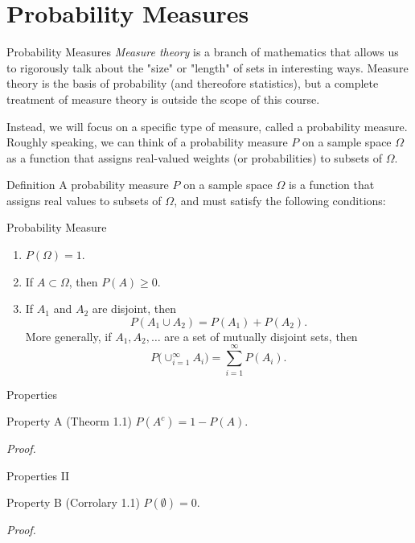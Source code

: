 \section{Probability Measures}

\begin{frame}{Probability Measures}
\emph{Measure theory} is a branch of mathematics that allows us to rigorously talk about the "size" or "length" of sets in interesting ways.
Measure theory is the basis of probability (and thereofore statistics), but a complete treatment of measure theory is outside the scope of this course. 

Instead, we will focus on a specific type of measure, called a \alert{probability measure}.
Roughly speaking, we can think of a probability measure $P$ on a sample space $\Omega$ as a function that assigns real-valued weights (or probabilities) to subsets of $\Omega$.
\end{frame}

\begin{frame}{Definition}
  A probability measure $P$ on a sample space $\Omega$ is a function that assigns real values to subsets of $\Omega$, and must satisfy the following conditions:
  \begin{block}{Probability Measure}
    \begin{enumerate}
      \item $P(\Omega) = 1$. 
      \item If $A \subset \Omega$, then $P(A) \geq 0$.
      \item If $A_1$ and $A_2$ are disjoint, then
      $$
      P(A_1 \cup A_2) = P(A_1) + P(A_2).
      $$
      More generally, if $A_1, A_2, \ldots$ are a set of mutually disjoint sets, then
      $$
      P\big(\cup_{i = 1}^\infty A_i\big) = \sum_{i = 1}^\infty P(A_i).
      $$
    \end{enumerate}
  \end{block}
\end{frame}

\begin{frame}{Properties}
  \begin{block}{Property A (Theorm 1.1)}
    $P(A^c) = 1 - P(A)$.
  \end{block}
  \emph{Proof.}
\end{frame}

\begin{frame}{Properties II}
  \begin{block}{Property B (Corrolary 1.1)}
    $P(\emptyset) = 0$.
  \end{block}
  \emph{Proof.}
\end{frame}

